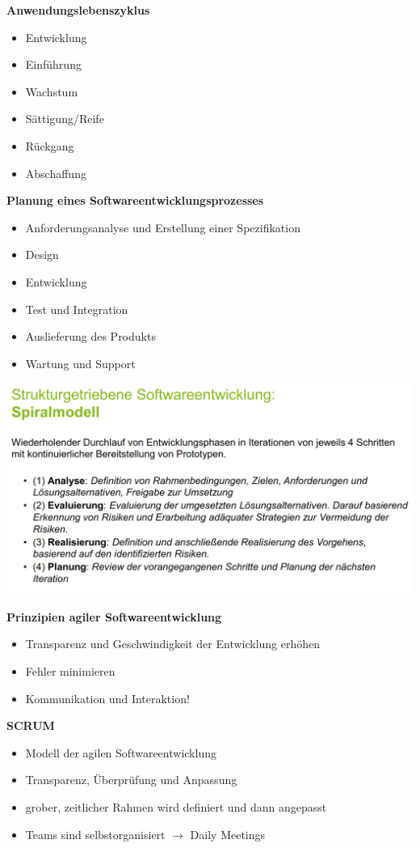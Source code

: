 \documentclass[a4]{scrartcl}
\begin{document}
\textbf{Anwendungslebenszyklus}

\begin{itemize}
\item Entwicklung
\item Einführung
\item Wachstum
\item Sättigung/Reife
\item Rückgang
\item Abschaffung
\end{itemize}

\textbf{Planung eines Softwareentwicklungsprozesses}

\begin{itemize}
\item Anforderungsanalyse und Erstellung einer Spezifikation
\item Design
\item Entwicklung
\item Test und Integration
\item Auslieferung des Produkts
\item Wartung und Support
\end{itemize}


\includegraphics[scale=0.3]{spiralmodell.png}

\textbf{Prinzipien agiler Softwareentwicklung}
\begin{itemize}
\item Transparenz und Geschwindigkeit der Entwicklung erhöhen
\item Fehler minimieren
\item Kommunikation und Interaktion!
\end{itemize}

\textbf{SCRUM}
\begin{itemize}
\item Modell der agilen Softwareentwicklung
\item Transparenz, Überprüfung und Anpassung
\item grober, zeitlicher Rahmen wird definiert und dann angepasst
\item Teams sind selbstorganisiert $\rightarrow$ Daily Meetings
\end{itemize}
\end{document}
